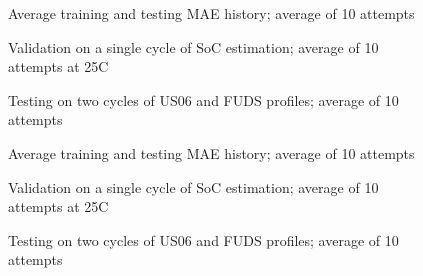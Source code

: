\begin{figure*}[htbp]
    \centering
    \begin{subfigure}[b]{0.325\textwidth}
        \centering
        
        \caption{Average training and testing MAE history; average of 10 attempts}
    \end{subfigure}
    \hfill
    \begin{subfigure}[b]{0.325\textwidth}
        \centering
        
        \caption{Validation on a single cycle of SoC estimation; average of 10 attempts at 25\textdegree{}C}
    \end{subfigure}
    \hfill
    \begin{subfigure}[b]{0.325\textwidth}
        \centering
        
        \caption{Testing on two cycles of US06 and FUDS profiles; average of 10 attempts}
        \label{subfig:Model-1res-DSTvsFUDS}
    \end{subfigure}
    \begin{subfigure}[b]{0.325\textwidth}
        \centering
        
        \caption{Average training and testing MAE history; average of 10 attempts}
    \end{subfigure}
    \hfill
    \begin{subfigure}[b]{0.325\textwidth}
        \centering
        
        \caption{Validation on a single cycle of SoC estimation; average of 10 attempts at 25\textdegree{}C}
    \end{subfigure}
    \hfill
    \begin{subfigure}[b]{0.325\textwidth}
        \centering
        
        \caption{Testing on two cycles of US06 and FUDS profiles; average of 10 attempts}
    \end{subfigure}
    \begin{subfigure}[b]{0.325\textwidth}

\end{subfigure}
\end{figure*}
